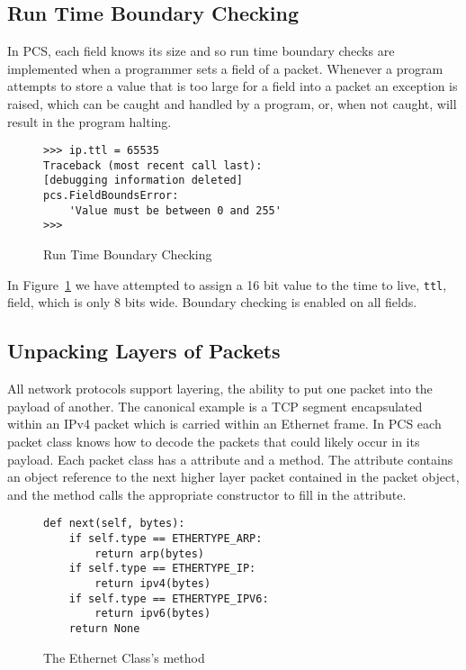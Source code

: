 \documentclass{sig-alternate-10pt}
\begin{document}
\subsection{Run Time Boundary Checking}
\label{sec:run-time-boundary-checking}

In PCS, each field knows its size and so run time boundary checks are
implemented when a programmer sets a field of a packet.  Whenever a
program attempts to store a value that is too large for a field into a
packet an exception is raised, which can be caught and handled by a
program, or, when not caught, will result in the program halting.

\begin{figure}
  \centering
\begin{verbatim}
>>> ip.ttl = 65535
Traceback (most recent call last):
[debugging information deleted]
pcs.FieldBoundsError: 
    'Value must be between 0 and 255'
>>> 
\end{verbatim}
  \caption{Run Time Boundary Checking}
  \label{fig:run-time-boundary-checking}
\end{figure}

In Figure~\ref{fig:run-time-boundary-checking} we have attempted to
assign a 16 bit value to the time to live, \verb|ttl|, field, which is
only 8 bits wide.  Boundary checking is enabled on all fields.

\subsection{Unpacking Layers of Packets}
\label{sec:unpacking-layers-of-packets}

All network protocols support layering, the ability to put one packet
into the payload of another.  The canonical example is a TCP segment
encapsulated within an IPv4 packet which is carried within an Ethernet
frame.  In PCS each packet class knows how to decode the packets that
could likely occur in its payload.  Each packet class has a
 attribute and a  method.  The 
attribute contains an object reference to the next higher layer packet
contained in the packet object, and the  method 
calls the appropriate constructor to fill in the 
attribute.

\begin{figure}
  \centering
\begin{verbatim}
def next(self, bytes):
    if self.type == ETHERTYPE_ARP:
        return arp(bytes)
    if self.type == ETHERTYPE_IP:
        return ipv4(bytes)
    if self.type == ETHERTYPE_IPV6:
        return ipv6(bytes)
    return None
\end{verbatim}
  \caption{The Ethernet Class's  method}
  \label{fig:ethernet-next-method}
\end{figure}
\end{document}
